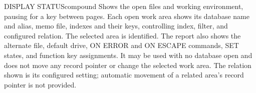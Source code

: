 \begin{XbaseEntry}{DISPLAY STATUS}{compound}
Shows the open files and working environment, pausing for a key between pages.
\Syntax
{}
\Usage
Each open work area shows its database name and alias, memo file, indexes and
their keys, controlling index, filter, and configured relation.  The selected
area is identified.  The report also shows the alternate file, default drive,
ON ERROR and ON ESCAPE commands, SET states, and function key assignments.
It may be used with no database open and does not move any record pointer or
change the selected work area.  The relation shown is its configured setting;
automatic movement of a related area's record pointer is not provided.
\end{XbaseEntry}

